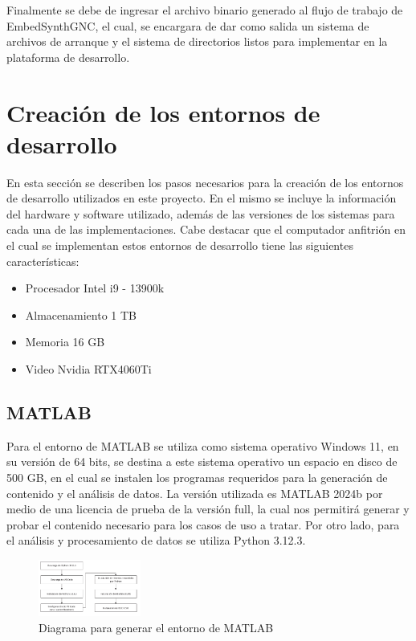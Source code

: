 Finalmente se debe de ingresar el archivo binario generado al flujo de trabajo de EmbedSynthGNC, el cual, se encargara de dar como salida un sistema de archivos de arranque y el sistema de directorios listos para implementar en la plataforma de desarrollo.


\section{Creación de los entornos de desarrollo}

En esta sección se describen los pasos necesarios para la creación de los entornos de desarrollo utilizados en este proyecto. En el mismo se incluye la información del hardware y software utilizado, además de las versiones de los sistemas para cada una de las implementaciones. Cabe destacar que el computador anfitrión en el cual se implementan estos entornos de desarrollo tiene las siguientes características:

\begin{itemize}
    \item Procesador Intel i9 - 13900k 
    \item Almacenamiento 1 TB
    \item Memoria 16 GB
    \item Video Nvidia RTX4060Ti
\end{itemize}

\subsection{MATLAB}\label{subsec:generacion_entorno_matlab}

Para el entorno de MATLAB se utiliza como sistema operativo Windows 11, en su versión de 64 bits, se destina a este sistema operativo un espacio en disco de 500 GB, en el cual se instalen los programas requeridos para la generación de contenido y el análisis de datos. La versión utilizada es MATLAB 2024b por medio de una licencia de prueba de la versión full, la cual nos permitirá generar y probar el contenido necesario para los casos de uso a tratar. Por otro lado, para el análisis y procesamiento de datos se utiliza Python 3.12.3.

\begin{figure}[h!]
    \centering
    \includegraphics[width=0.3\textwidth]{fig/especifico_2/Entorno_windows}
    \caption{Diagrama para generar el entorno de MATLAB}
    \label{fig:diagrama_entorno_matlab}
\end{figure}


